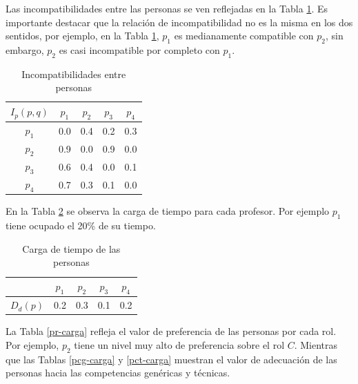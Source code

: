 Las incompatibilidades entre las personas se ven reflejadas en la Tabla \ref{iep-carga}. Es importante destacar que la relación de incompatibilidad no es la misma en los dos sentidos, por ejemplo, en la Tabla \ref{iep-carga}, $ p_1 $ es medianamente compatible con $ p_2 $, sin embargo, $ p_2 $ es casi incompatible por completo con $ p_1 $.

\begin{table}[H]
	\centering
	\caption{Incompatibilidades entre personas}\label{iep-carga}
	\begin{tabular}{|c|c|c|c|c|}
		\hline
		$I_p(p,q)$ & $p_1$& $p_2$& $p_3$& $p_4$ \\ \hline
		$p_1$  	   & 0.0  &  0.4 & 0.2  &  0.3 \\ \hline
		$p_2$ 	   & 0.9  &  0.0 & 0.9  &  0.0 \\ \hline
		$p_3$      & 0.6  &  0.4 & 0.0  &  0.1 \\ \hline
		$p_4$ 	   & 0.7  &  0.3 & 0.1  &  0.0 \\ \hline
	\end{tabular}
\end{table}

En la Tabla \ref{tp-carga} se observa la carga de tiempo para cada profesor. Por ejemplo $ p_1 $ tiene ocupado el 20\% de su tiempo.

\begin{table}[H]
	\centering
	\caption{Carga de tiempo de las personas}\label{tp-carga}
	\begin{tabular}{|c|c|c|c|c|}
		\cline{2-5}
		\multicolumn{1}{c|}{}& $p_1$ & $p_2$ & $p_3$  & $p_4$ \\ \hline
		$D_d(p)$    & 0.2 & 0.3 & 0.1 & 0.2 \\ \hline
	\end{tabular}
\end{table}

%
La Tabla \ref{pr-carga} refleja el valor de preferencia de las personas por cada rol. Por ejemplo, $p_2$  tiene un nivel muy alto de preferencia sobre el rol  $C$. Mientras que las Tablas \ref{pcg-carga} y \ref{pct-carga} muestran el valor de adecuación de las personas hacia las competencias genéricas y técnicas.

